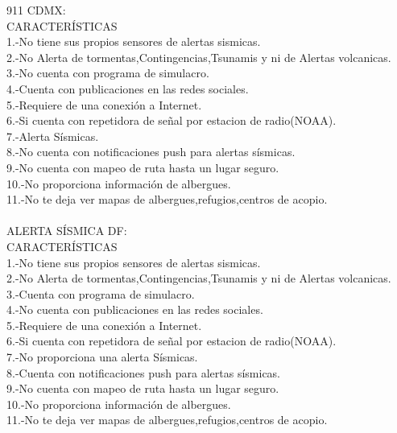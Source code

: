 911 CDMX:\\CARACTERÍSTICAS\\1.-No tiene sus propios sensores de alertas sismicas.\\2.-No Alerta de tormentas,Contingencias,Tsunamis y ni de Alertas volcanicas.\\3.-No cuenta con programa de simulacro.\\4.-Cuenta con publicaciones en las redes sociales.\\5.-Requiere de una conexión a Internet.\\6.-Si cuenta con repetidora de señal por estacion de radio(NOAA).\\7.-Alerta Sísmicas.\\8.-No cuenta con notificaciones push para alertas sísmicas.\\9.-No cuenta con mapeo de ruta hasta un lugar seguro.\\10.-No proporciona información de albergues.\\11.-No te deja ver mapas de albergues,refugios,centros de acopio.\\
\\

ALERTA SÍSMICA DF:\\CARACTERÍSTICAS\\1.-No tiene sus propios sensores de alertas sismicas.\\2.-No Alerta de tormentas,Contingencias,Tsunamis y ni de Alertas volcanicas.\\3.-Cuenta con programa de simulacro.\\4.-No cuenta con publicaciones en las redes sociales.\\5.-Requiere de una conexión a Internet.\\6.-Si cuenta con repetidora de señal por estacion de radio(NOAA).\\7.-No proporciona una alerta Sísmicas.\\8.-Cuenta con notificaciones push para alertas sísmicas.\\9.-No cuenta con mapeo de ruta hasta un lugar seguro.\\10.-No proporciona información de albergues.\\11.-No te deja ver mapas de albergues,refugios,centros de acopio.\\
\\


